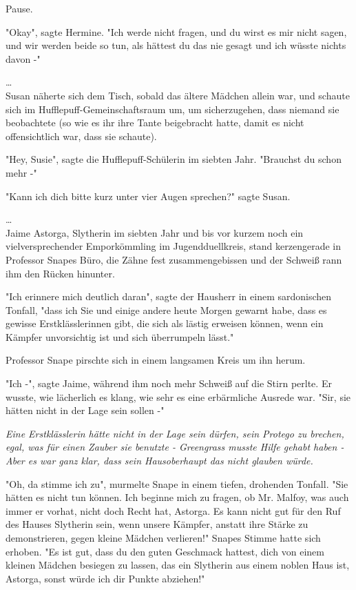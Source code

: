 {Pause.

"Okay", sagte Hermine. "Ich werde nicht fragen, und du wirst es mir nicht sagen, und wir werden beide so tun, als hättest du das nie gesagt und ich wüsste nichts davon -"

…\\ Susan näherte sich dem Tisch, sobald das ältere Mädchen allein war, und schaute sich im Hufflepuff-Gemeinschaftsraum um, um sicherzugehen, dass niemand sie beobachtete (so wie es ihr ihre Tante beigebracht hatte, damit es nicht offensichtlich war, dass sie schaute).

"Hey, Susie", sagte die Hufflepuff-Schülerin im siebten Jahr. "Brauchst du schon mehr -"

"Kann ich dich bitte kurz unter vier Augen sprechen?" sagte Susan.

…\\ Jaime Astorga, Slytherin im siebten Jahr und bis vor kurzem noch ein vielversprechender Emporkömmling im Jugendduellkreis, stand kerzengerade in Professor Snapes Büro, die Zähne fest zusammengebissen und der Schweiß rann ihm den Rücken hinunter.

"Ich erinnere mich deutlich daran", sagte der Hausherr in einem sardonischen Tonfall, "dass ich Sie und einige andere heute Morgen gewarnt habe, dass es gewisse Erstklässlerinnen gibt, die sich als lästig erweisen können, wenn ein Kämpfer unvorsichtig ist und sich überrumpeln lässt."

Professor Snape pirschte sich in einem langsamen Kreis um ihn herum.

"Ich -", sagte Jaime, während ihm noch mehr Schweiß auf die Stirn perlte. Er wusste, wie lächerlich es klang, wie sehr es eine erbärmliche Ausrede war. "Sir, sie hätten nicht in der Lage sein sollen -"

\emph{Eine Erstklässlerin hätte nicht in der Lage sein dürfen, sein Protego zu brechen, egal, was für einen Zauber sie benutzte - Greengrass musste Hilfe gehabt haben - Aber es war ganz klar, dass sein Hausoberhaupt das nicht glauben würde.}

"Oh, da stimme ich zu", murmelte Snape in einem tiefen, drohenden Tonfall. "Sie hätten es nicht tun können. Ich beginne mich zu fragen, ob Mr. Malfoy, was auch immer er vorhat, nicht doch Recht hat, Astorga. Es kann nicht gut für den Ruf des Hauses Slytherin sein, wenn unsere Kämpfer, anstatt ihre Stärke zu demonstrieren, gegen kleine Mädchen verlieren!" Snapes Stimme hatte sich erhoben. "Es ist gut, dass du den guten Geschmack hattest, dich von einem kleinen Mädchen besiegen zu lassen, das ein Slytherin aus einem noblen Haus ist, Astorga, sonst würde ich dir Punkte abziehen!"

}
